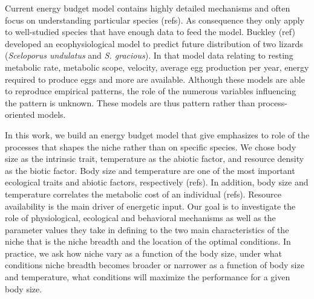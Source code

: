 Current energy budget model contains highly detailed mechanisms and often focus on understanding particular species (refs).
As consequence they only apply to well-studied species that have enough data to feed the model.
Buckley (ref) developed an ecophysiological model to predict future distribution of two lizards (\textit{Sceloporus undulatus} and \textit{S. gracious}).
In that model data relating to resting metabolic rate, metabolic scope, velocity, average egg production per year, energy required to produce eggs and more are available.
Although these models are able to reproduce empirical patterns, the role of the numerous variables influencing the pattern is unknown.
These models are thus pattern rather than process-oriented models.

In this work, we build an energy budget model that give emphasizes to role of the processes that shapes the niche rather than on specific species.
We chose body size as the intrinsic trait, temperature as the abiotic factor, and resource density as the biotic factor.
Body size and temperature are one of the most important ecological traits and abiotic factors, respectively (refs).
In addition, body size and temperature correlates the metabolic cost of an individual (refs).
Resource availability is the main driver of energetic input. 
Our goal is to investigate the role of physiological, ecological and behavioral mechanisms as well as the parameter values they take in defining to the two main characteristics of the niche that is the niche breadth and the location of the optimal conditions.
In practice, we ask how niche vary as a function of the body size, under what conditions niche breadth becomes broader or narrower as a function of body size and temperature, what conditions will maximize the performance for a given body size.
